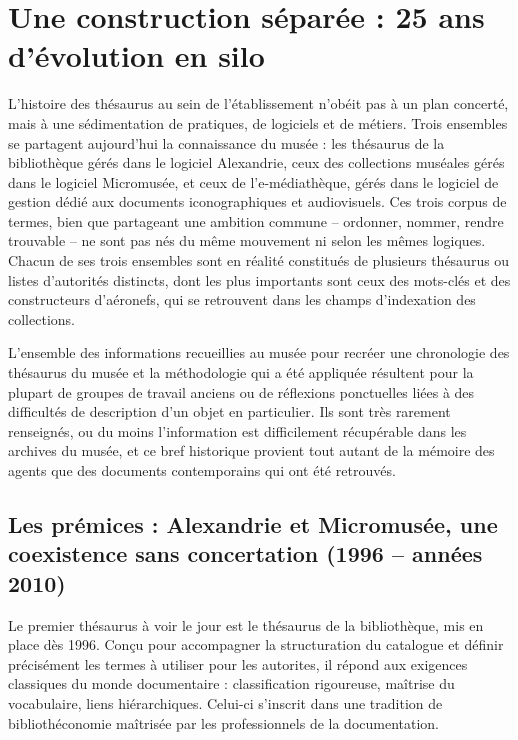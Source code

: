 \section{\label{II-A-1}Une construction séparée : 25 ans d'évolution en silo}

L’histoire des thésaurus au sein de l’établissement n’obéit pas à un plan concerté, mais à une sédimentation de pratiques, de logiciels et de métiers. Trois ensembles se partagent aujourd'hui la connaissance du musée : les thésaurus de la bibliothèque gérés dans le logiciel Alexandrie, ceux des collections muséales gérés dans le logiciel Micromusée, et ceux de l’e-médiathèque, gérés dans le logiciel de gestion dédié aux documents iconographiques et audiovisuels. Ces trois corpus de termes, bien que partageant une ambition commune – ordonner, nommer, rendre trouvable – ne sont pas nés du même mouvement ni selon les mêmes logiques. Chacun de ses trois ensembles sont en réalité constitués de plusieurs thésaurus ou listes d'autorités distincts, dont les plus importants sont ceux des mots-clés et des constructeurs d'aéronefs, qui se retrouvent dans les champs d'indexation des collections.


L'ensemble des informations recueillies au musée pour recréer une chronologie des thésaurus du musée et la méthodologie qui a été appliquée résultent pour la plupart de groupes de travail anciens ou de réflexions ponctuelles liées à des difficultés de description d'un objet en particulier. Ils sont très rarement renseignés, ou du moins l'information est difficilement récupérable dans les archives du musée, et ce bref historique provient tout autant de la mémoire des agents que des documents contemporains qui ont été retrouvés.

\subsection{Les prémices : Alexandrie et Micromusée, une coexistence sans concertation (1996 – années 2010)}

Le premier thésaurus à voir le jour est le thésaurus de la bibliothèque, mis en place dès 1996. Conçu pour accompagner la structuration du catalogue et définir précisément les termes à utiliser pour les \glspl{autorite}, il répond aux exigences classiques du monde documentaire : classification rigoureuse, maîtrise du vocabulaire, liens hiérarchiques. Celui-ci s’inscrit dans une tradition de bibliothéconomie maîtrisée par les professionnels de la documentation.

